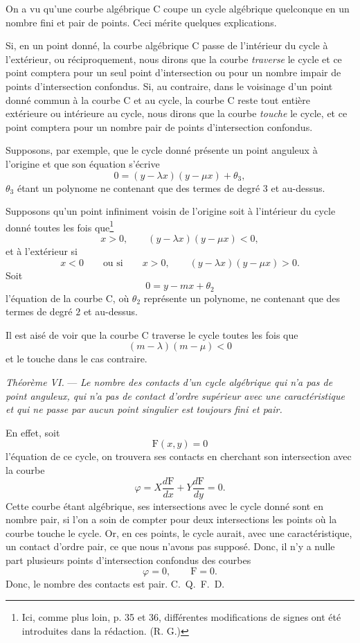 \documentclass[11pt]{article}
\begin{document}
On a vu qu’une courbe algébrique C coupe un cycle algébrique quelconque en un nombre fini et pair de points. Ceci mérite quelques explications.

Si, en un point donné, la courbe algébrique C passe de l’intérieur du cycle à l’extérieur, ou réciproquement, nous dirons que la courbe \emph{traverse} le cycle et ce point comptera pour un seul point d’intersection ou pour un nombre impair de points d’intersection confondus. Si, au contraire, dans le voisinage d’un point donné commun à la courbe C et au cycle, la courbe C reste tout entière extérieure ou intérieure au cycle, nous dirons que la courbe \emph{touche} le cycle, et ce point comptera pour un nombre pair de points d’intersection confondus.

Supposons, par exemple, que le cycle donné présente un point anguleux à l’origine et que son équation s’écrive
\[
0=(y-\lambda x)(y-\mu x)+\theta_3,
\]
$\theta_3$ étant un polynome ne contenant que des termes de degré $3$ et au-dessus.

Supposons qu’un point infiniment voisin de l’origine soit à l’intérieur du cycle donné toutes les fois que\footnote{Ici, comme plus loin, p. 35 et 36, différentes modifications de signes ont été introduites dans la rédaction. (R. G.)}
\[
x>0,\qquad (y-\lambda x)(y-\mu x)<0,
\]
et à l’extérieur si
\[
x<0\qquad\text{ou si}\qquad x>0,\qquad (y-\lambda x)(y-\mu x)>0.
\]
Soit
\[
0=y-mx+\theta_2
\]
l’équation de la courbe C, où $\theta_2$ représente un polynome, ne contenant que des termes de degré $2$ et au-dessus.

Il est aisé de voir que la courbe C traverse le cycle toutes les fois que
\[
(m-\lambda)(m-\mu)<0
\]
et le touche dans le cas contraire.

\emph{Théorème VI.} --- \emph{Le nombre des contacts d’un cycle algébrique qui n’a pas de point anguleux, qui n’a pas de contact d’ordre supérieur avec une caractéristique et qui ne passe par aucun point singulier est toujours fini et pair.}

En effet, soit
\[
\mathrm F(x,y)=0
\]
l’équation de ce cycle, on trouvera ses contacts en cherchant son intersection avec la courbe
\[
\varphi=X\frac{d\mathrm F}{dx}+Y\frac{d\mathrm F}{dy}=0.
\]
Cette courbe étant algébrique, ses intersections avec le cycle donné sont en nombre pair, si l’on a soin de compter pour deux intersections les points où la courbe touche le cycle. Or, en ces points, le cycle aurait, avec une caractéristique, un contact d’ordre pair, ce que nous n’avons pas supposé. Donc, il n’y a nulle part plusieurs points d’intersection confondus des courbes
\[
\varphi=0,\qquad \mathrm F=0.
\]
Donc, le nombre des contacts est pair. \hfill\mbox{C. Q. F. D.}
\end{document}
